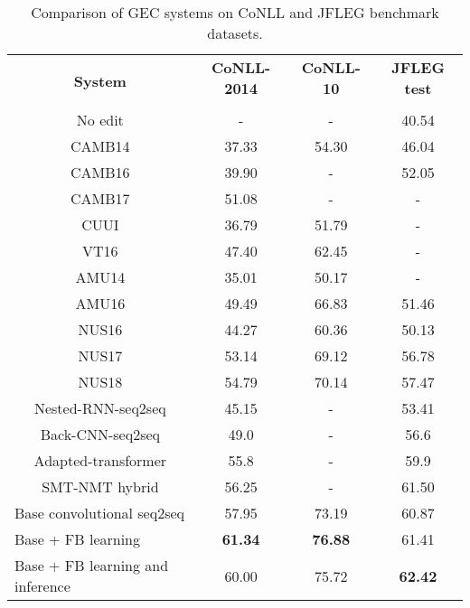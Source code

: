 \documentclass{article} \usepackage{MSRA_TR,times}
\begin{document}
\begin{table}[t]
\centering
\small
\begin{tabular}{c|c|c|c}
\hline
\multirow{2}{*}{\textbf{System}} & \textbf{CoNLL-2014} & \textbf{CoNLL-10} & \textbf{JFLEG test} \\
                                 &                    &                  &                 \\ \hline
No edit                          & -                   & -                 & 40.54               \\
CAMB14                           & 37.33               & 54.30             & 46.04            \\
CAMB16                           & 39.90               & -                 & 52.05               \\
CAMB17 & 51.08 & - & - \\
CUUI & 36.79 & 51.79 & - \\
VT16 & 47.40 & 62.45 & - \\
AMU14 & 35.01 & 50.17 & - \\
AMU16                            & 49.49               & 66.83             & 51.46               \\
NUS16                            & 44.27               & 60.36             & 50.13               \\
NUS17                            & 53.14               & 69.12             & 56.78               \\
NUS18                            & 54.79               & 70.14                 & 57.47               \\
Nested-RNN-seq2seq                   & 45.15               & -                 & 53.41               \\
Back-CNN-seq2seq & 49.0 &  - & 56.6 \\
Adapted-transformer & 55.8 & - & 59.9 \\
SMT-NMT hybrid                   & 56.25               & -             & 61.50               \\ \hline
\multicolumn{1}{l|}{Base convolutional seq2seq}   &  57.95       &          73.19           &        60.87          \\
\multicolumn{1}{l|}{Base + FB learning}      &    \bf 61.34    &   \bf 76.88 &  61.41    \\
\multicolumn{1}{l|}{Base + FB learning and inference}        &        60.00        & 75.72 & \bf 62.42               \\ \hline
\end{tabular}
\caption{Comparison of GEC systems on CoNLL and JFLEG benchmark datasets.}
\label{tab:gec_result}
\end{table}
\end{document}
